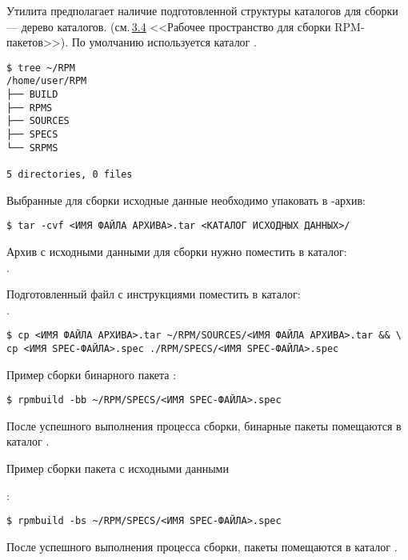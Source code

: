 Утилита предполагает наличие подготовленной структуры каталогов для сборки --- дерево каталогов.
(см.\,\hyperlink{3.4}{3.4} <<Рабочее пространство для сборки RPM-пакетов>>). По умолчанию используется
каталог .

\begin{verbatim}
$ tree ~/RPM
/home/user/RPM
├── BUILD
├── RPMS
├── SOURCES
├── SPECS
└── SRPMS

5 directories, 0 files
\end{verbatim}

Выбранные для сборки исходные данные необходимо упаковать в -архив:

\begin{verbatim}
$ tar -cvf <ИМЯ ФАЙЛА АРХИВА>.tar <КАТАЛОГ ИСХОДНЫХ ДАННЫХ>/
\end{verbatim}

Архив с исходными данными для сборки нужно поместить в каталог:\\ .

Подготовленный  файл с инструкциями поместить в каталог: \\.

\begin{verbatim}
$ cp <ИМЯ ФАЙЛА АРХИВА>.tar ~/RPM/SOURCES/<ИМЯ ФАЙЛА АРХИВА>.tar && \
cp <ИМЯ SPEC-ФАЙЛА>.spec ./RPM/SPECS/<ИМЯ SPEC-ФАЙЛА>.spec
\end{verbatim}

Пример сборки бинарного пакета :
\begin{verbatim}
$ rpmbuild -bb ~/RPM/SPECS/<ИМЯ SPEC-ФАЙЛА>.spec
\end{verbatim}
После успешного выполнения процесса сборки, бинарные пакеты  помещаются в каталог .

\hypertarget{rpmbuild-exampl-src}{Пример сборки пакета с исходными данными }:
\begin{verbatim}
$ rpmbuild -bs ~/RPM/SPECS/<ИМЯ SPEC-ФАЙЛА>.spec
\end{verbatim}
После успешного выполнения процесса сборки, пакеты  помещаются в каталог .

